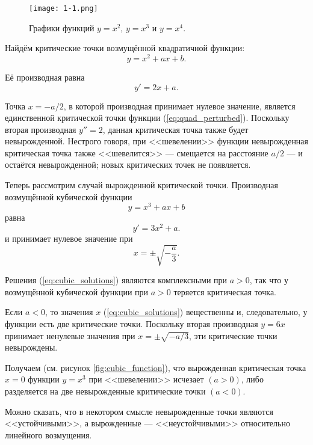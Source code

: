 \documentclass[a4paper,12pt,openany,leqno]{extbook}
\begin{document}
    \begin{figure}[t]
    \texttt{[image: 1-1.png]}
    \caption{Графики функций $y = x^2$, $y = x^3$ и $y = x^4$.}
    \label{fig:power_functions}
    \end{figure}
    
    Найдём критические точки возмущённой квадратичной функции:
    \begin{equation}
    y = x^2 + ax + b.
    \label{eq:quad_perturbed}
    \end{equation}
    
    Её производная равна
    \[ y' = 2x + a. \]
    
    Точка $x = -a/2$, в которой производная принимает нулевое значение, является единственной критической точки функции (\ref{eq:quad_perturbed}). Поскольку вторая производная $y'' = 2$, данная критическая точка также будет невырожденной. Нестрого говоря, при <<шевелении>> функции невырожденная критическая точка также <<шевелится>> --- смещается на расстояние $a/2$ --- и остаётся невырожденной; новых критических точек не появляется.
    
    Теперь рассмотрим случай вырожденной критической точки. Производная возмущённой кубической функции
    \begin{equation}
    y = x^3 + ax + b
    \label{eq:cubic_perturbed}
    \end{equation}
    равна
    \[ y' = 3x^2 + a. \]
    и принимает нулевое значение при
    \begin{equation}
    x = \pm\sqrt{-\frac{a}{3}}.
    \label{eq:cubic_solutions}
    \end{equation}
    
    Решения (\ref{eq:cubic_solutions}) являются комплексными при $a > 0$, так что у возмущённой кубической функции при $a > 0$ теряется критическая точка.
    
    Если $a < 0$, то значения $x$ (\ref{eq:cubic_solutions}) вещественны и, следовательно, у функции есть две критические точки. Поскольку вторая производная $y = 6x$ принимает ненулевые значения при $x = \pm\sqrt{-a/3}$, эти критические точки невырождены.
    
    Получаем (см. рисунок \ref{fig:cubic_function}), что вырожденная критическая точка $x = 0$ функции $y = x^3$ при <<шевелении>> исчезает $(a > 0)$, либо разделяется на две невырожденные критические точки $(a < 0)$.
    
    Можно сказать, что в некотором смысле невырожденные точки являются <<устойчивыми>>, а вырожденные --- <<неустойчивыми>> относительно линейного возмущения.
    
\end{document}

